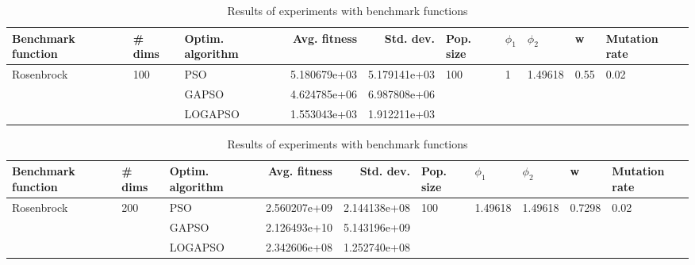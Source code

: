 \documentclass{article}
\begin{document}
\begin{table}
\centering
\caption{Results of experiments with benchmark functions}
\begin{tabular}{lllrrlllll}
\toprule
         Benchmark function &              \# dims & Optim. algorithm &  Avg. fitness &    Std. dev. &            Pop. size &         $\phi_{1}$ &               $\phi_{2}$ &                     w &         Mutation rate \\
\midrule
\multirow{3}{*}{Rosenbrock} & \multirow{3}{*}{100} &              PSO &  5.180679e+03 & 5.179141e+03 & \multirow{3}{*}{100} & \multirow{3}{*}{1} & \multirow{3}{*}{1.49618} & \multirow{3}{*}{0.55} & \multirow{3}{*}{0.02} \\
                            &                      &            GAPSO &  4.624785e+06 & 6.987808e+06 &                      &                    &                          &                       &                       \\
                            &                      &          LOGAPSO &  1.553043e+03 & 1.912211e+03 &                      &                    &                          &                       &                       \\
\bottomrule
\end{tabular}
\end{table}
\begin{table}
\centering
\caption{Results of experiments with benchmark functions}
\begin{tabular}{lllrrlllll}
\toprule
         Benchmark function &              \# dims & Optim. algorithm &  Avg. fitness &    Std. dev. &            Pop. size &               $\phi_{1}$ &               $\phi_{2}$ &                       w &         Mutation rate \\
\midrule
\multirow{3}{*}{Rosenbrock} & \multirow{3}{*}{200} &              PSO &  2.560207e+09 & 2.144138e+08 & \multirow{3}{*}{100} & \multirow{3}{*}{1.49618} & \multirow{3}{*}{1.49618} & \multirow{3}{*}{0.7298} & \multirow{3}{*}{0.02} \\
                            &                      &            GAPSO &  2.126493e+10 & 5.143196e+09 &                      &                          &                          &                         &                       \\
                            &                      &          LOGAPSO &  2.342606e+08 & 1.252740e+08 &                      &                          &                          &                         &                       \\
\bottomrule
\end{tabular}
\end{table}
\end{document}
